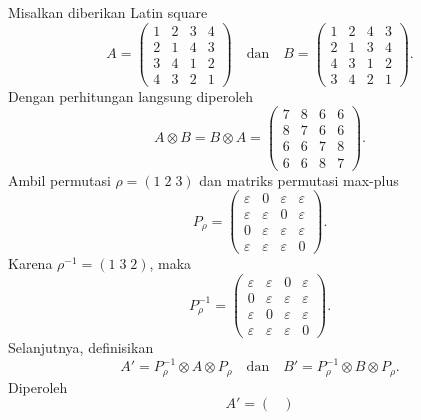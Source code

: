 \begin{contoh}\label{contoh:konjugasi_menjaga_komutatif}
  Misalkan diberikan Latin square
  \[
    A=
    \begin{pmatrix}
      1 & 2 & 3 & 4 \\
      2 & 1 & 4 & 3 \\
      3 & 4 & 1 & 2 \\
      4 & 3 & 2 & 1
    \end{pmatrix}
    \quad
    \text{dan}
    \quad
    B=
    \begin{pmatrix}
      1 & 2 & 4 & 3 \\
      2 & 1 & 3 & 4 \\
      4 & 3 & 1 & 2 \\
      3 & 4 & 2 & 1
    \end{pmatrix}.
  \]
  Dengan perhitungan langsung diperoleh
  \[
    A\otimes B
    =
    B\otimes A
    =
    \begin{pmatrix}
      7 & 8 & 6 & 6 \\
      8 & 7 & 6 & 6 \\
      6 & 6 & 7 & 8 \\
      6 & 6 & 8 & 7
    \end{pmatrix}.
  \]
  Ambil permutasi $\rho=(1\;2\;3)$ dan matriks permutasi max-plus
  \[
    P_\rho=
    \begin{pmatrix}
      \varepsilon & 0           & \varepsilon & \varepsilon \\
      \varepsilon & \varepsilon & 0           & \varepsilon \\
      0           & \varepsilon & \varepsilon & \varepsilon \\
      \varepsilon & \varepsilon & \varepsilon & 0
    \end{pmatrix}.
  \]
  Karena $\rho^{-1}=(1\;3\;2)$, maka
  \[
    P_\rho^{-1}=
    \begin{pmatrix}
      \varepsilon & \varepsilon & 0           & \varepsilon \\
      0           & \varepsilon & \varepsilon & \varepsilon \\
      \varepsilon & 0           & \varepsilon & \varepsilon \\
      \varepsilon & \varepsilon & \varepsilon & 0
    \end{pmatrix}.
  \]
  Selanjutnya, definisikan
  \[
    A'=P_\rho^{-1}\otimes A\otimes P_\rho
    \quad\text{dan}\quad
    B'=P_\rho^{-1}\otimes B\otimes P_\rho.
  \]
  Diperoleh
  \[
    A'=
    \begin{pmatrix}

\end{pmatrix}\]
\end{contoh}
